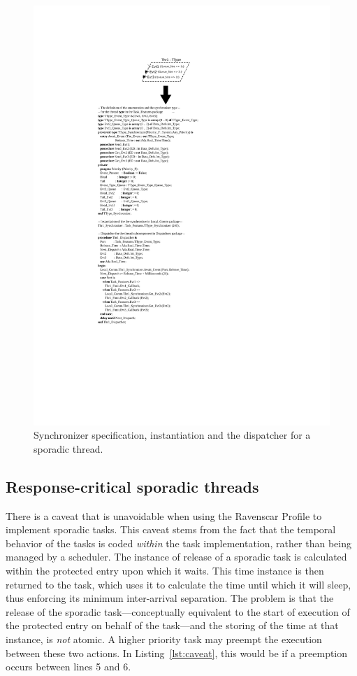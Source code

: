 \begin{figure}
\centering
\includegraphics{figs/eventports}
\caption{Synchronizer specification, instantiation and the dispatcher
  for a sporadic thread.}
\label{fig:dispatcher}
\end{figure}
\clearpage

\subsection{Response-critical sporadic threads}
\label{sec:response_crit_st}
There is a caveat that is unavoidable when using the Ravenscar Profile
to implement sporadic tasks. This caveat stems from the fact that the
temporal behavior of the tasks is coded \emph{within} the task
implementation, rather than being managed by a scheduler. The instance
of release of a sporadic task is calculated within the protected entry
upon which it waits. This time instance is then returned to the task,
which uses it to calculate the time until which it will sleep, thus
enforcing its minimum inter-arrival separation. The problem is that
the release of the sporadic task---conceptually equivalent to the
start of execution of the protected entry on behalf of the task---and
the storing of the time at that instance, is \emph{not} atomic. A
higher priority task may preempt the execution between these two
actions. In Listing~\ref{lst:caveat}, this would be if a preemption
occurs between lines 5 and 6.

